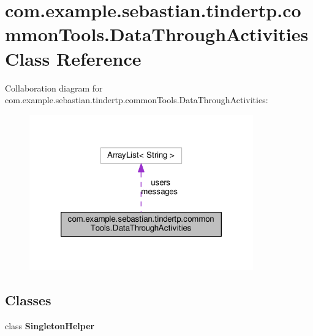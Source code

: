 \hypertarget{classcom_1_1example_1_1sebastian_1_1tindertp_1_1commonTools_1_1DataThroughActivities}{}\section{com.\+example.\+sebastian.\+tindertp.\+common\+Tools.\+Data\+Through\+Activities Class Reference}
\label{classcom_1_1example_1_1sebastian_1_1tindertp_1_1commonTools_1_1DataThroughActivities}


Collaboration diagram for com.\+example.\+sebastian.\+tindertp.\+common\+Tools.\+Data\+Through\+Activities\+:\nopagebreak
\begin{figure}[H]
\begin{center}
\leavevmode
\includegraphics[width=274pt]{classcom_1_1example_1_1sebastian_1_1tindertp_1_1commonTools_1_1DataThroughActivities__coll__graph}
\end{center}
\end{figure}
\subsection*{Classes}
\begin{DoxyCompactItemize}
\item 
class {\bfseries Singleton\+Helper}
\end{DoxyCompactItemize}
